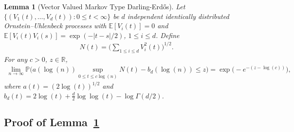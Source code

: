 \documentclass[10pt]{article}
\def\E{\mathbb{E}}
\def\P{\mathbb{P}}
\def\reals{\mathbb{R}}
\newtheorem{lemma}[theorem]{Lemma}
\theoremstyle{definition}
\theoremstyle{remark}
\begin{document}
\begin{lemma}[Vector Valued Markov Type Darling-Erd\H{o}s]\label{sa-remark: darling erdos}
    Let $\{(V_1(t),\ldots,V_d(t)): 0 \leq t < \infty\}$ be $d$ independent identically distributed Ornstein--Uhlenbeck processes with $\E[V_i(t)] = 0$ and $\E[V_i(t) V_i(s)] = \exp(-|t - s|/2)$, $1 \leq i \leq d$. Define
    \begin{align*}
        N(t) = \bigg(\sum_{1 \leq i \leq d} V_i^2(t) \bigg)^{1/2}.
    \end{align*}
    For any $c > 0$, $z \in \reals$,
    \begin{align*}
        \lim_{n \rightarrow \infty}\P \Big(a(\log(n)) \sup_{0 \leq t \leq c \log (n)} N(t) - b_d(\log (n)) \leq z \Big) = \exp \Big(-e^{-(z - \log(c))} \Big),
    \end{align*}
    where $a(t) = (2 \log(t))^{1/2}$ and $b_d(t) = 2 \log(t) + \frac{d}{2} \log \log(t) - \log \Gamma(d/2)$.
\end{lemma}

\subsection*{Proof of Lemma~\ref{sa-remark: darling erdos}}\label{sa-sec: proof of multivariate darling erdos}
\end{document}
